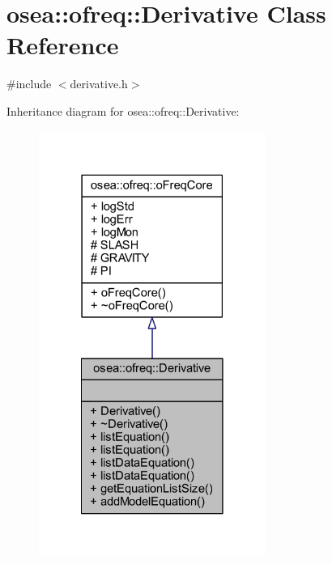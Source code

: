 \hypertarget{classosea_1_1ofreq_1_1_derivative}{\section{osea\-:\-:ofreq\-:\-:Derivative Class Reference}
\label{classosea_1_1ofreq_1_1_derivative}
}


{\ttfamily \#include $<$derivative.\-h$>$}



Inheritance diagram for osea\-:\-:ofreq\-:\-:Derivative\-:
\nopagebreak
\begin{figure}[H]
\begin{center}
\leavevmode
\includegraphics[width=210pt]{classosea_1_1ofreq_1_1_derivative__inherit__graph}
\end{center}
\end{figure}
